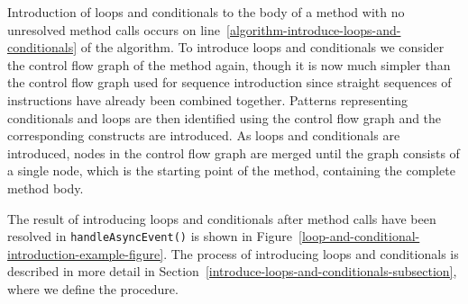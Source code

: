 Introduction of loops and conditionals to the body of a method with no
unresolved method calls occurs on
line~\ref{algorithm-introduce-loops-and-conditionals} of the
algorithm.
To introduce loops and conditionals we consider the control flow graph
of the method again, though it is now much simpler than the control
flow graph used for sequence introduction since straight sequences of
instructions have already been combined together.
Patterns representing conditionals and loops are then identified using
the control flow graph and the corresponding constructs are
introduced.
As loops and conditionals are introduced, nodes in the control flow
graph are merged until the graph consists of a single node, which is
the starting point of the method, containing the complete method body.

The result of introducing loops and conditionals after method calls
have been resolved in \texttt{handleAsyncEvent()} is shown in
Figure~\ref{loop-and-conditional-introduction-example-figure}.
The process of introducing loops and conditionals is described in more
detail in Section~\ref{introduce-loops-and-conditionals-subsection},
where we define the  procedure.
